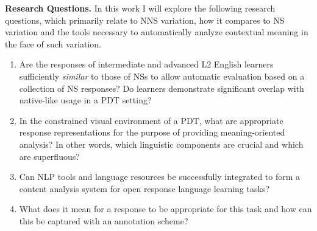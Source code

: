 \documentclass[11pt]{article}
\begin{document}
\noindent \textbf{Research Questions.} In this work I will explore the following research questions, which primarily relate to NNS variation, how it compares to NS variation and the tools necessary to automatically analyze contextual meaning in the face of such variation.

\begin{enumerate}
\item{Are the responses of intermediate and advanced L2 English learners sufficiently \textit{similar} to those of NSs to allow automatic evaluation based on a collection of NS responses? Do learners demonstrate significant overlap with native-like usage in a PDT setting?} %

\item{In the constrained visual environment of a PDT, what are appropriate response representations for the purpose of providing meaning-oriented analysis? In other words, which linguistic components are crucial and which are superfluous?}

\item{Can NLP tools and language resources be successfully integrated to form a content analysis system for open response language learning tasks?}

\item{What does it mean for a response to be appropriate for this task and how can this be captured with an annotation scheme?}
\end{enumerate}
\end{document}
